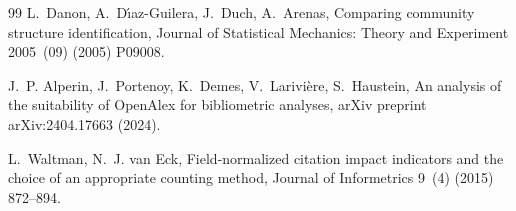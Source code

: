 \documentclass[preprint,12pt]{elsarticle}
\begin{document}
\begin{thebibliography}{99}
L.~Danon, A.~D{\'\i}az-Guilera, J.~Duch, A.~Arenas, Comparing community structure identification, Journal of Statistical Mechanics: Theory and Experiment 2005~(09) (2005) P09008.

J.~P. Alperin, J.~Portenoy, K.~Demes, V.~Larivi{\`e}re, S.~Haustein, An analysis of the suitability of OpenAlex for bibliometric analyses, arXiv preprint arXiv:2404.17663 (2024).

L.~Waltman, N.~J. van Eck, Field-normalized citation impact indicators and the choice of an appropriate counting method, Journal of Informetrics 9~(4) (2015) 872--894.

\end{thebibliography}
\end{document}
